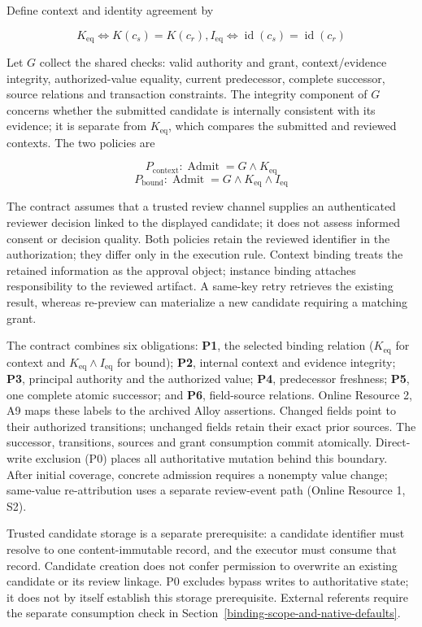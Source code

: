 \documentclass[pdflatex,sn-basic]{sn-jnl}
\begin{document}
Define context and identity agreement by

\[
K_{\mathrm{eq}} \Leftrightarrow  K(c_s) = K(c_r),   I_{\mathrm{eq}} \Leftrightarrow  \operatorname{id}(c_s) = \operatorname{id}(c_r)
\]

Let \(G\) collect the shared checks: valid authority and grant, context/evidence integrity, authorized-value equality, current predecessor, complete successor, source relations and transaction constraints. The integrity component of \(G\) concerns whether the submitted candidate is internally consistent with its evidence; it is separate from \(K_{\mathrm{eq}}\), which compares the submitted and reviewed contexts. The two policies are

\[
P_{\mathrm{context}}: \operatorname{Admit} = G \land  K_{\mathrm{eq}}
\] \[
P_{\mathrm{bound}}:   \operatorname{Admit} = G \land  K_{\mathrm{eq}} \land  I_{\mathrm{eq}}
\]

The contract assumes that a trusted review channel supplies an authenticated reviewer decision linked to the displayed candidate; it does not assess informed consent or decision quality. Both policies retain the reviewed identifier in the authorization; they differ only in the execution rule. Context binding treats the retained information as the approval object; instance binding attaches responsibility to the reviewed artifact. A same-key retry retrieves the existing result, whereas re-preview can materialize a new candidate requiring a matching grant.

The contract combines six obligations: \textbf{P1}, the selected binding relation ($K_{\mathrm{eq}}$ for context and $K_{\mathrm{eq}}\land I_{\mathrm{eq}}$ for bound); \textbf{P2}, internal context and evidence integrity; \textbf{P3}, principal authority and the authorized value; \textbf{P4}, predecessor freshness; \textbf{P5}, one complete atomic successor; and \textbf{P6}, field-source relations. Online Resource 2, A9 maps these labels to the archived Alloy assertions. Changed fields point to their authorized transitions; unchanged fields retain their exact prior sources. The successor, transitions, sources and grant consumption commit atomically. Direct-write exclusion (P0) places all authoritative mutation behind this boundary. After initial coverage, concrete admission requires a nonempty value change; same-value re-attribution uses a separate review-event path (Online Resource 1, S2).

Trusted candidate storage is a separate prerequisite: a candidate identifier must resolve to one content-immutable record, and the executor must consume that record. Candidate creation does not confer permission to overwrite an existing candidate or its review linkage. P0 excludes bypass writes to authoritative state; it does not by itself establish this storage prerequisite. External referents require the separate consumption check in Section~\ref{binding-scope-and-native-defaults}.
\end{document}
